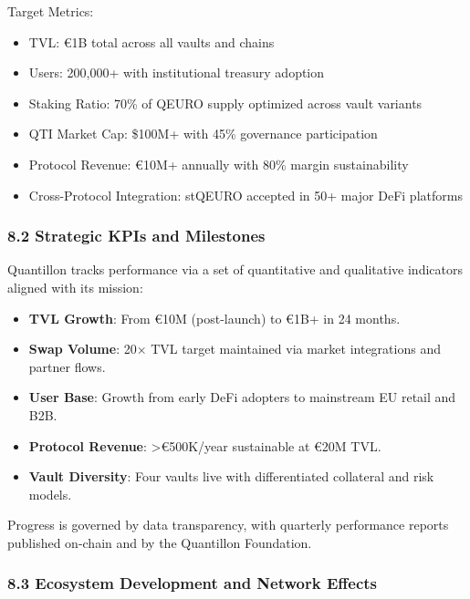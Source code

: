 Target Metrics:

\begin{itemize}
\item
  TVL: €1B total across all vaults and chains
\item
  Users: 200,000+ with institutional treasury adoption
\item
  Staking Ratio: 70\% of QEURO supply optimized across vault variants
\item
  QTI Market Cap: \$100M+ with 45\% governance participation
\item
  Protocol Revenue: €10M+ annually with 80\% margin sustainability
\item
  Cross-Protocol Integration: stQEURO accepted in 50+ major DeFi
  platforms
\end{itemize}

\hypertarget{strategic-kpis-and-milestones}{%
\subsubsection{8.2 Strategic KPIs and
Milestones}\label{strategic-kpis-and-milestones}}

Quantillon tracks performance via a set of quantitative and qualitative
indicators aligned with its mission:

\begin{itemize}
\item
  \textbf{TVL Growth}: From €10M (post-launch) to €1B+ in 24 months.
\item
  \textbf{Swap Volume}: 20× TVL target maintained via market
  integrations and partner flows.
\item
  \textbf{User Base}: Growth from early DeFi adopters to mainstream EU
  retail and B2B.
\item
  \textbf{Protocol Revenue}: \textgreater€500K/year sustainable at €20M
  TVL.
\item
  \textbf{Vault Diversity}: Four vaults live with differentiated
  collateral and risk models.
\end{itemize}

Progress is governed by data transparency, with quarterly performance
reports published on-chain and by the Quantillon Foundation.

\hypertarget{ecosystem-development-and-network-effects}{%
\subsubsection{8.3 Ecosystem Development and Network
Effects}\label{ecosystem-development-and-network-effects}}

